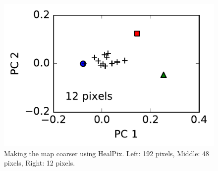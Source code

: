 \documentclass[iop,numberedappendix,apj,]{emulateapj}
\begin{document}
\begin{figure}[tbh!]
\begin{minipage}{0.33\hsize}
\begin{center}
\includegraphics[width=\hsize]{IGBP_PCplane_Nside0.pdf}
    \end{center}
     \end{minipage}
    \caption{Making the map coarser using HealPix. Left: 192 pixels, Middle: 48 pixels, Right: 12 pixels. }
\label{fig:lowresolution}
\end{figure}
\end{document}
